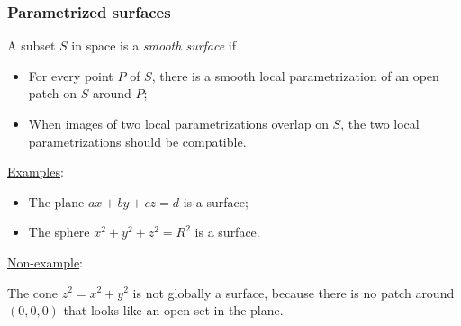\begin{frame}
  \frametitle{Parametrized surfaces}

  A subset $S$ in space is a \emph{smooth surface} if
%
\begin{itemize}
  \item For every point $P$ of $S$, there is a smooth local parametrization of an open patch on $S$ around $P$;
  \item When images of two local parametrizations overlap on $S$, the two local parametrizations should be compatible.
\end{itemize}

\noindent \underline{Examples}:
\begin{itemize}
  \item \pause The plane $ax+by+cz=d$ is a surface;
  \item \pause The sphere $x^2+y^2+z^2=R^2$ is a surface.
\end{itemize}

\pause \underline{Non-example}:

The cone $z^2= x^2+y^2$ is not globally a surface\pause , because there is no patch around $(0,0,0)$ that looks like an open set in the plane.
\end{frame}
